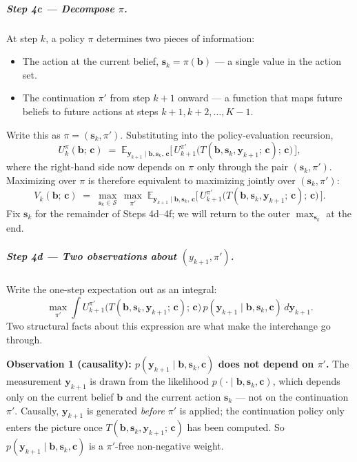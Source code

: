 \documentclass[11pt]{article}
\newcommand{\bc}{\bm{c}}
\newcommand{\by}{\bm{y}}
\newcommand{\bs}{\bm{s}}
\newcommand{\bb}{\bm{b}}
\newcommand{\E}{\mathbb{E}}
\begin{document}
\subparagraph{Step 4c --- Decompose $\pi$.}  At step $k$, a policy $\pi$ determines two pieces of information:
\begin{itemize}[nosep, leftmargin=*]
\item The action at the current belief, $\bs_k = \pi(\bb)$ --- a single value in the action set.
\item The continuation $\pi'$ from step $k+1$ onward --- a function that maps future beliefs to future actions at steps $k+1, k+2, \ldots, K-1$.
\end{itemize}
Write this as $\pi = (\bs_k, \pi')$.  Substituting into the policy-evaluation recursion,
\begin{equation}
U^\pi_k(\bb;\, \bc) \;=\; \E_{\by_{k+1} \mid \bb, \bs_k,\, \bc}\!\bigl[\, U^{\pi'}_{k+1}\bigl(T(\bb, \bs_k, \by_{k+1};\, \bc);\, \bc\bigr)\,\bigr],
\end{equation}
where the right-hand side now depends on $\pi$ only through the pair $(\bs_k, \pi')$.  Maximizing over $\pi$ is therefore equivalent to maximizing jointly over $(\bs_k, \pi')$:
\begin{equation}
V_k(\bb;\, \bc) \;=\; \max_{\bs_k \in \mathcal{S}}\,\max_{\pi'}\; \E_{\by_{k+1} \mid \bb, \bs_k,\, \bc}\!\bigl[\, U^{\pi'}_{k+1}\bigl(T(\bb, \bs_k, \by_{k+1};\, \bc);\, \bc\bigr)\,\bigr].
\label{eq:double_max_tutorial}
\end{equation}
Fix $\bs_k$ for the remainder of Steps 4d--4f; we will return to the outer $\max_{\bs_k}$ at the end.

\subparagraph{Step 4d --- Two observations about $(y_{k+1}, \pi')$.}  Write the one-step expectation out as an integral:
\begin{equation}
\max_{\pi'} \int U^{\pi'}_{k+1}\bigl(T(\bb, \bs_k, \by_{k+1};\, \bc);\, \bc\bigr)\, p(\by_{k+1} \mid \bb, \bs_k, \bc)\, d\by_{k+1}.
\label{eq:max_integral}
\end{equation}
Two structural facts about this expression are what make the interchange go through.

\textbf{Observation 1 (causality): $p(\by_{k+1} \mid \bb, \bs_k, \bc)$ does not depend on $\pi'$.}  The measurement $\by_{k+1}$ is drawn from the likelihood $p(\cdot \mid \bb, \bs_k, \bc)$, which depends only on the current belief $\bb$ and the current action $\bs_k$ --- not on the continuation $\pi'$.  Causally, $\by_{k+1}$ is generated \emph{before} $\pi'$ is applied; the continuation policy only enters the picture once $T(\bb, \bs_k, \by_{k+1};\, \bc)$ has been computed.  So $p(\by_{k+1} \mid \bb, \bs_k, \bc)$ is a $\pi'$-free non-negative weight.
\end{document}
